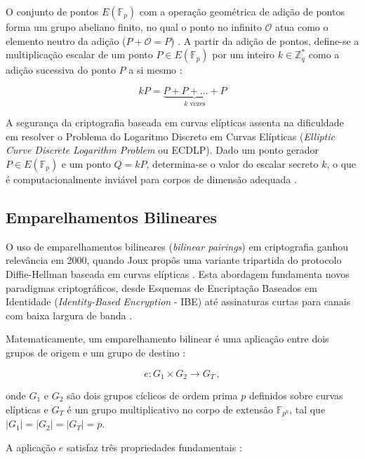 O conjunto de pontos $E(\mathbb{F}_p)$ com a operação geométrica de adição de pontos forma um grupo abeliano finito, no qual o ponto no infinito $\mathcal{O}$ atua como o elemento neutro da adição ($P + \mathcal{O} = P$) \cite{hankerson2004guide}. A partir da adição de pontos, define-se a multiplicação escalar de um ponto $P \in E(\mathbb{F}_p)$ por um inteiro $k \in \mathbb{Z}_q^*$ como a adição sucessiva do ponto $P$ a si mesmo \cite{portnoi_ecc}:

\begin{equation*}
    kP = \underbrace{P + P + \ldots + P}_{k \text{ vezes}}
\end{equation*}

A segurança da criptografia baseada em curvas elípticas assenta na dificuldade em resolver o Problema do Logaritmo Discreto em Curvas Elípticas (\textit{Elliptic Curve Discrete Logarithm Problem} ou ECDLP). Dado um ponto gerador $P \in E(\mathbb{F}_p)$ e um ponto $Q = kP$, determina-se o valor do escalar secreto $k$, o que é computacionalmente inviável para corpos de dimensão adequada \cite{portnoi_ecc}.

\subsection{Emparelhamentos Bilineares}

O uso de emparelhamentos bilineares (\textit{bilinear pairings}) em criptografia ganhou relevância em 2000, quando Joux propôs uma variante tripartida do protocolo Diffie-Hellman baseada em curvas elípticas \cite{joux2000tripartite}. Esta abordagem fundamenta novos paradigmas criptográficos, desde Esquemas de Encriptação Baseados em Identidade (\textit{Identity-Based Encryption} - IBE) \cite{boneh2001ibe} até assinaturas curtas para canais com baixa largura de banda \cite{boneh2001short}.

Matematicamente, um emparelhamento bilinear é uma aplicação entre dois grupos de origem e um grupo de destino \cite{salin2023pairing}:

\begin{equation*}
    e : G_1 \times G_2 \longrightarrow G_T \, ,
\end{equation*}

onde $G_1$ e $G_2$ são dois grupos cíclicos de ordem prima $p$ definidos sobre curvas elípticas \cite{salin2023pairing} e $G_T$ é um grupo multiplicativo no corpo de extensão $\mathbb{F}_{p^k}$, tal que $|G_1| = |G_2| = |G_T| = p$.

A aplicação $e$ satisfaz três propriedades fundamentais \cite{salin2023pairing}:

